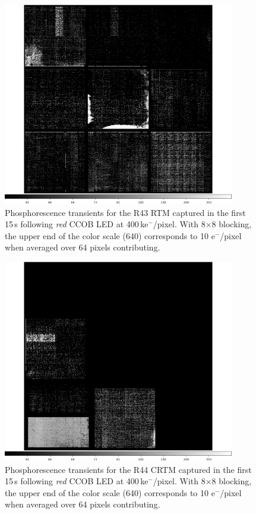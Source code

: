 \begin{figure}[!htbp]
\centering
\includegraphics[width=0.9\textwidth]{figures/phosphorescence-survey/itl_fluor_R43_0-19_rb1_log.png}
\caption{Phosphorescence transients for the R43 RTM captured in the first 15\,s following {\it red} CCOB LED at 400\,ke$^-$/pixel. With 8$\times$8 blocking, the upper end of the color scale (640) corresponds to 10 e$^-$/pixel when averaged over 64 pixels contributing.}
\label{fig:phos:R43}
\end{figure}

\begin{figure}[!htbp]
\centering
\includegraphics[width=0.9\textwidth]{figures/phosphorescence-survey/itl_fluor_R44_0-19_rb1_log.png}
\caption{Phosphorescence transients for the R44 CRTM captured in the first 15\,s following {\it red} CCOB LED at 400\,ke$^-$/pixel. With 8$\times$8 blocking, the upper end of the color scale (640) corresponds to 10 e$^-$/pixel when averaged over 64 pixels contributing.}
\label{fig:phos:R44}
\end{figure}
